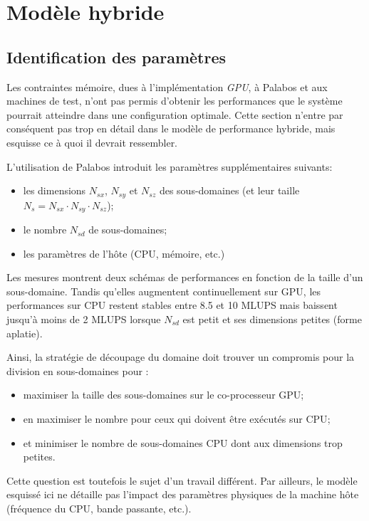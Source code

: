 \section{Modèle hybride}
\subsection{Identification des paramètres}
Les contraintes mémoire, dues à l'implémentation \textit{GPU}, à Palabos et aux machines de test, n'ont pas permis d'obtenir les performances que le système pourrait atteindre dans une configuration optimale. Cette section n'entre par conséquent pas trop en détail dans le modèle de performance hybride, mais esquisse ce à quoi il devrait ressembler. 

L'utilisation de Palabos introduit les paramètres supplémentaires suivants:
\begin{itemize}
\item les dimensions $N_{sx}$, $N_{sy}$ et $N_{sz}$ des sous-domaines (et leur taille $N_{s} = N_{sx}\cdot N_{sy}\cdot N_{sz}$);
\item le nombre $N_{sd}$ de sous-domaines;
\item les paramètres de l'hôte (\acs{CPU}, mémoire, etc.)
\end{itemize}

Les mesures montrent  deux schémas de performances en fonction de la taille d'un sous-domaine. Tandis qu’elles augmentent continuellement sur \acs{GPU}, les performances sur \acs{CPU} restent stables entre 8.5 et 10 \acs{MLUPS} mais baissent jusqu'à moins de 2 \acs{MLUPS} lorsque $N_{sd}$ est petit et ses dimensions petites (forme aplatie).

Ainsi,  la stratégie de découpage du domaine doit trouver un compromis pour la division en sous-domaines pour :
\begin{itemize}
\item maximiser la taille des sous-domaines sur le co-processeur \acs{GPU};
\item en maximiser le nombre pour ceux qui doivent être exécutés sur \acs{CPU};
\item et minimiser le nombre de sous-domaines \acs{CPU} dont aux dimensions trop petites.
\end{itemize}

\noindent Cette question est toutefois le sujet d'un travail différent. Par ailleurs, le modèle esquissé ici ne détaille pas l'impact des paramètres physiques de la machine hôte (fréquence du \acs{CPU}, bande passante, etc.).

